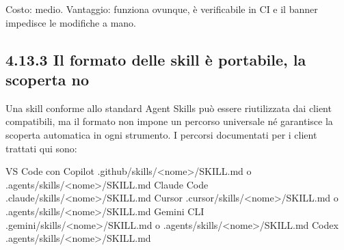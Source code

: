 \documentclass[
  italian,
  10pt,
]{book}
\newenvironment{Shaded}{\begin{snugshade}}{\end{snugshade}}
\newcommand{\CharTok}[1]{\textcolor[rgb]{0.31,0.60,0.02}{#1}}
\newcommand{\CommentTok}[1]{\textcolor[rgb]{0.56,0.35,0.01}{\textit{#1}}}
\newcommand{\ControlFlowTok}[1]{\textcolor[rgb]{0.13,0.29,0.53}{\textbf{#1}}}
\newcommand{\FunctionTok}[1]{\textcolor[rgb]{0.13,0.29,0.53}{\textbf{#1}}}
\newcommand{\KeywordTok}[1]{\textcolor[rgb]{0.13,0.29,0.53}{\textbf{#1}}}
\newcommand{\NormalTok}[1]{#1}
\newcommand{\OperatorTok}[1]{\textcolor[rgb]{0.81,0.36,0.00}{\textbf{#1}}}
\newcommand{\StringTok}[1]{\textcolor[rgb]{0.31,0.60,0.02}{#1}}
\newcommand{\VariableTok}[1]{\textcolor[rgb]{0.00,0.00,0.00}{#1}}
\begin{document}
\begin{Shaded}
\end{Shaded}

Costo: medio. Vantaggio: funziona ovunque, è verificabile in CI e il
banner impedisce le modifiche a mano.

\subsection{4.13.3 Il formato delle skill è portabile, la scoperta
no}\label{il-formato-delle-skill-uxe8-portabile-la-scoperta-no}

Una skill conforme allo standard Agent Skills può essere riutilizzata
dai client compatibili, ma il formato non impone un percorso universale
né garantisce la scoperta automatica in ogni strumento. I percorsi
documentati per i client trattati qui sono:

\begin{Shaded}
\begin{Highlighting}[]
\NormalTok{VS Code con Copilot   .github/skills/\textless{}nome\textgreater{}/SKILL.md o .agents/skills/\textless{}nome\textgreater{}/SKILL.md}
\NormalTok{Claude Code           .claude/skills/\textless{}nome\textgreater{}/SKILL.md}
\NormalTok{Cursor                .cursor/skills/\textless{}nome\textgreater{}/SKILL.md o .agents/skills/\textless{}nome\textgreater{}/SKILL.md}
\NormalTok{Gemini CLI            .gemini/skills/\textless{}nome\textgreater{}/SKILL.md o .agents/skills/\textless{}nome\textgreater{}/SKILL.md}
\NormalTok{Codex                 .agents/skills/\textless{}nome\textgreater{}/SKILL.md}
\end{Highlighting}
\end{Shaded}
\end{document}
